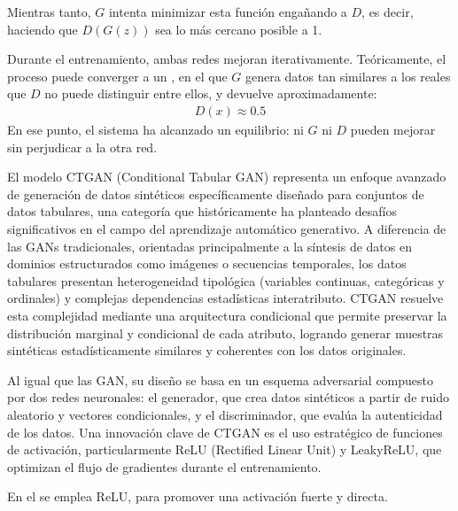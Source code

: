 \documentclass[a4paper,10pt,spanish]{jupyterBook}
\begin{document}
\sphinxAtStartPar
Mientras tanto, \(G\) intenta minimizar esta función engañando a \(D\), es decir, haciendo que \(D(G(z))\) sea lo más cercano posible a 1.

\sphinxAtStartPar
Durante el entrenamiento, ambas redes mejoran iterativamente. Teóricamente, el proceso puede converger a un , en el que \(G\) genera datos tan similares a los reales que \(D\) no puede distinguir entre ellos, y devuelve aproximadamente:
\begin{equation*}
\begin{split}
D(x) \approx 0.5
\end{split}
\end{equation*}
\sphinxAtStartPar
En ese punto, el sistema ha alcanzado un equilibrio: ni \(G\) ni \(D\) pueden mejorar sin perjudicar a la otra red.

\sphinxAtStartPar
El modelo CTGAN (Conditional Tabular GAN) representa un enfoque avanzado de generación de datos sintéticos específicamente diseñado para conjuntos de datos tabulares, una categoría que históricamente ha planteado desafíos significativos en el campo del aprendizaje automático generativo. A diferencia de las GANs tradicionales, orientadas principalmente a la síntesis de datos en dominios estructurados como imágenes o secuencias temporales, los datos tabulares presentan heterogeneidad tipológica (variables continuas, categóricas y ordinales) y complejas dependencias estadísticas interatributo. CTGAN resuelve esta complejidad mediante una arquitectura condicional que permite preservar la distribución marginal y condicional de cada atributo, logrando generar muestras sintéticas estadísticamente similares y coherentes con los datos originales.

\sphinxAtStartPar
Al igual que las GAN, su diseño se basa en un esquema adversarial compuesto por dos redes neuronales: el generador, que crea datos sintéticos a partir de ruido aleatorio y vectores condicionales, y el discriminador, que evalúa la autenticidad de los datos. Una innovación clave de CTGAN es el uso estratégico de funciones de activación, particularmente ReLU (Rectified Linear Unit) y LeakyReLU, que optimizan el flujo de gradientes durante el entrenamiento.

\sphinxAtStartPar
En el  se emplea ReLU, para promover una activación fuerte y directa.
\end{document}
